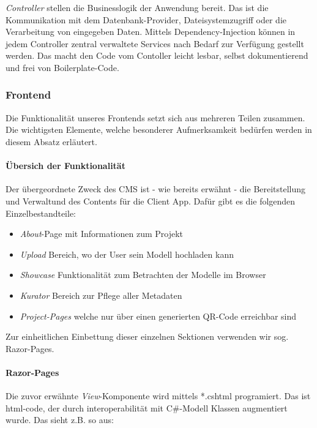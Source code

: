 \documentclass[titlepage, a4paper, 11pt]{scrartcl}
\begin{document}
        \textit{Controller} stellen die Businesslogik der Anwendung bereit. Das ist die Kommunikation mit dem Datenbank-Provider, Dateisystemzugriff oder die Verarbeitung von eingegeben Daten.
        Mittels Dependency-Injection können in jedem Controller zentral verwaltete Services nach Bedarf zur Verfügung gestellt werden. Das macht den Code vom Contoller leicht lesbar, selbst dokumentierend
        und frei von Boilerplate-Code.

      \subsubsection{Frontend}

        Die Funktionalität unseres Frontends setzt sich aus mehreren Teilen zusammen. Die wichtigsten Elemente, welche besonderer Aufmerksamkeit bedürfen werden in diesem Absatz erläutert.

        \paragraph{Übersich der Funktionalität}

          Der übergeordnete Zweck des CMS ist - wie bereits erwähnt - die Bereitstellung und Verwaltund des Contents für die Client App. Dafür gibt es die folgenden Einzelbestandteile:

          \begin{itemize}
            \item \textit{About}-Page mit Informationen zum Projekt
            \item \textit{Upload} Bereich, wo der User sein Modell hochladen kann
            \item \textit{Showcase} Funktionalität zum Betrachten der Modelle im Browser
            \item \textit{Kurator} Bereich zur Pflege aller Metadaten
            \item \textit{Project-Pages} welche nur über einen generierten QR-Code erreichbar sind
          \end{itemize}
          
          Zur einheitlichen Einbettung dieser einzelnen Sektionen verwenden wir sog. Razor-Pages.

        \paragraph{Razor-Pages}

        Die zuvor erwähnte \textit{View}-Komponente wird mittels *.cshtml programiert. Das ist html-code, der durch interoperabilität mit C\#-Modell Klassen augmentiert wurde.
        Das sieht z.B. so aus:
\end{document}
